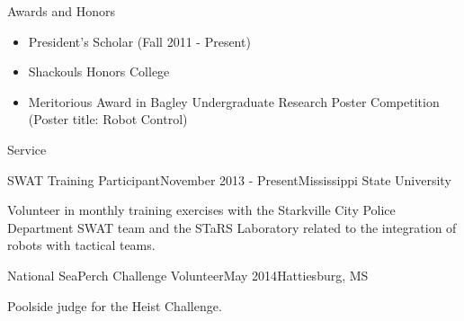 \documentclass{resume} %
\begin{document}

\begin{rSection}{Awards and Honors}
	\begin{multicols}{2}
		\begin{itemize}
			\item President's Scholar (Fall 2011 - Present)
			\item Shackouls Honors College
			\item Meritorious Award in Bagley Undergraduate Research Poster Competition (Poster title: Robot Control)

		\end{itemize}
	\end{multicols}
\end{rSection}



\begin{rSection}{Service}
	
	\begin{rSubsection}{SWAT Training Participant}{November 2013 - Present}{Mississippi State University}{}
		\item Volunteer in monthly training exercises with the Starkville City Police Department SWAT team and the STaRS Laboratory related to the integration of robots with tactical teams.
	\end{rSubsection}
	
	\begin{rSubsection}{National SeaPerch Challenge Volunteer}{May 2014}{Hattiesburg, MS}{}
		\item Poolside judge for the Heist Challenge.
	\end{rSubsection}	
	
\end{rSection}





\end{document}

